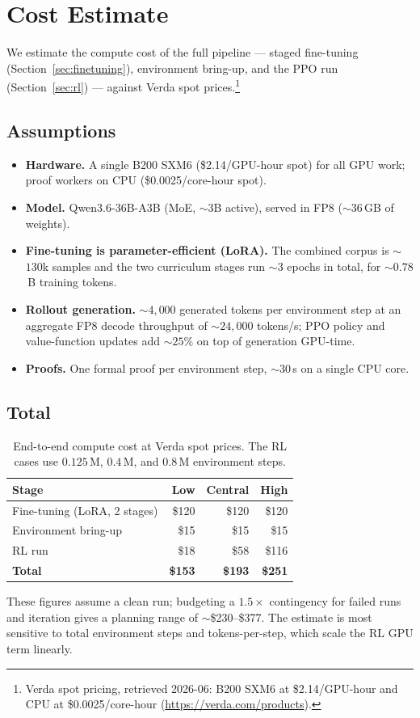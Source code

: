 \section{Cost Estimate}
\label{sec:cost}

We estimate the compute cost of the full pipeline --- staged fine-tuning
(Section~\ref{sec:finetuning}), environment bring-up, and the PPO run
(Section~\ref{sec:rl}) --- against Verda spot prices.\footnote{Verda spot
pricing, retrieved 2026-06: B200 SXM6 at \$2.14/GPU-hour and CPU at
\$0.0025/core-hour (\url{https://verda.com/products}).}

\subsection{Assumptions}
\label{sec:cost-assumptions}

\begin{itemize}
    \item \textbf{Hardware.} A single B200 SXM6 (\$2.14/GPU-hour spot) for all
    GPU work; proof workers on CPU (\$0.0025/core-hour spot).
    \item \textbf{Model.} Qwen3.6-36B-A3B (MoE, $\sim$$3$B active), served in
    FP8 ($\sim$$36$\,GB of weights).
    \item \textbf{Fine-tuning is parameter-efficient (LoRA).} The combined
    corpus is $\sim$$130$k samples and the two curriculum stages run
    $\sim$$3$ epochs in total, for $\sim$$0.78$\,B training tokens.
    \item \textbf{Rollout generation.} $\sim$$4{,}000$ generated tokens per
    environment step at an aggregate FP8 decode throughput of
    $\sim$$24{,}000$ tokens/s; PPO policy and value-function updates add
    $\sim$$25\%$ on top of generation GPU-time.
    \item \textbf{Proofs.} One formal proof per environment step, $\sim$$30$\,s on
    a single CPU core.
\end{itemize}

\subsection{Total}
\label{sec:cost-total}

\begin{table}[h]
\centering
\begin{tabular}{lrrr}
\hline
Stage & Low & Central & High \\
\hline
Fine-tuning (LoRA, 2 stages) & \$120 & \$120 & \$120 \\
Environment bring-up         & \$15  & \$15  & \$15  \\
RL run                       & \$18  & \$58  & \$116 \\
\hline
\textbf{Total}               & \textbf{\$153} & \textbf{\$193} & \textbf{\$251} \\
\hline
\end{tabular}
\caption{End-to-end compute cost at Verda spot prices. The RL cases use
$0.125$\,M, $0.4$\,M, and $0.8$\,M environment steps.}
\label{tab:cost-total}
\end{table}

These figures assume a clean run; budgeting a $1.5\times$ contingency for
failed runs and iteration gives a planning range of $\sim$\$230--\$377. The
estimate is most sensitive to total environment steps and tokens-per-step,
which scale the RL GPU term linearly.
